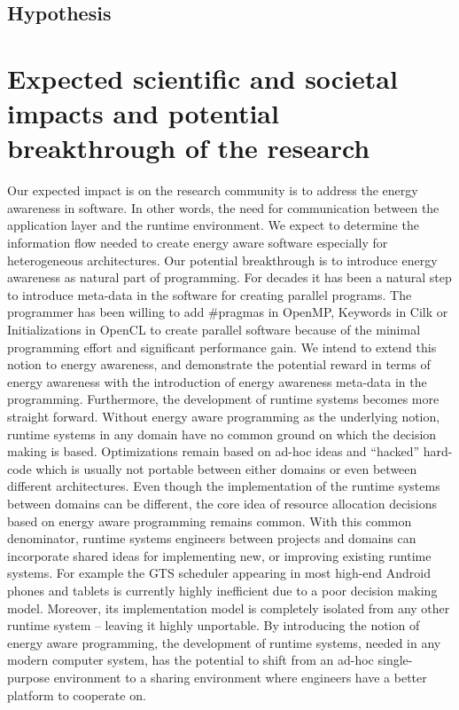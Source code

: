 \documentclass{article}
\begin{document}
\subsection{Hypothesis}

\section{Expected scientific and societal impacts and potential breakthrough of the research}
Our expected impact is on the research community is to address the energy awareness in software. 
In other words, the need for communication between the application layer and the runtime environment. 
We expect to determine the information flow needed to create energy aware software especially for heterogeneous architectures. 
Our potential breakthrough is to introduce energy awareness as natural part of programming. 
For decades it has been a natural step to introduce meta-data in the software for creating parallel programs. 
The programmer has been willing to add \#pragmas in OpenMP, Keywords in Cilk or Initializations in OpenCL to create parallel software because of the minimal programming effort and significant performance gain. 
We intend to extend this notion to energy awareness, and demonstrate the potential reward in terms of energy awareness with the introduction of energy awareness meta-data in the programming. 
Furthermore, the development of runtime systems becomes more straight forward. 
Without energy aware programming as the underlying notion, runtime systems in any domain have no common ground on which the decision making is based. 
Optimizations remain based on ad-hoc ideas and “hacked” hard-code which is usually not portable between either domains or even between different architectures. 
Even though the implementation of the runtime systems between domains can be different, the core idea of resource allocation decisions based on energy aware programming remains common. 
With this common denominator, runtime systems engineers between projects and domains can incorporate shared ideas for implementing new, or improving existing runtime systems. 
For example the GTS scheduler appearing in most high-end Android phones and tablets is currently highly inefficient due to a poor decision making model. 
Moreover, its implementation model is completely isolated from any other runtime system – leaving it highly unportable. 
By introducing the notion of energy aware programming, the development of runtime systems, needed in any modern computer system, has the potential to shift from an ad-hoc single-purpose environment to a sharing environment where engineers have a better platform to cooperate on.
\end{document}
